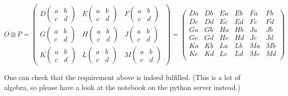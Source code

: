 \documentclass[12pt]{article}
\begin{document}
\[O\otimes P=
\left(\begin{array}{ccc}
D\left(\begin{array}{cc}
a&b\\
c&d
\end{array}\right)
&E
\left(\begin{array}{cc}
a&b\\
c&d
\end{array}\right)&F\left(\begin{array}{cc}
a&b\\
c&d
\end{array}\right)\\
G\left(\begin{array}{cc}
a&b\\
c&d
\end{array}\right)&H\left(\begin{array}{cc}
a&b\\
c&d
\end{array}\right)&J\left(\begin{array}{cc}
a&b\\
c&d
\end{array}\right)\\
K \left(\begin{array}{cc}
a&b\\
c&d
\end{array}\right) &L\left(\begin{array}{cc}
a&b\\
c&d
\end{array}\right)&M\left(\begin{array}{cc}
a&b\\
c&d
\end{array}\right)
\end{array}\right)
=
\left(\begin{array}{cccccc}
Da & Db & Ea & Eb & Fa & Fb\\
Dc & Dd & Ec & Ed & Fc & Fd\\
Ga & Gb & Ha & Hb & Ja & Jb\\
Gc & Gd & Hc & Hd & Jc & Jd\\
Ka & Kb & La & Lb & Ma & Mb\\
Kc & Kd & Lc & Ld & Mc & Md\\\end{array}\right)
\]  

One can check that the requirement above is indeed fulfilled. (This is a lot of algebra, so please have a look at the notebook on the python server instead.)
\end{document}
